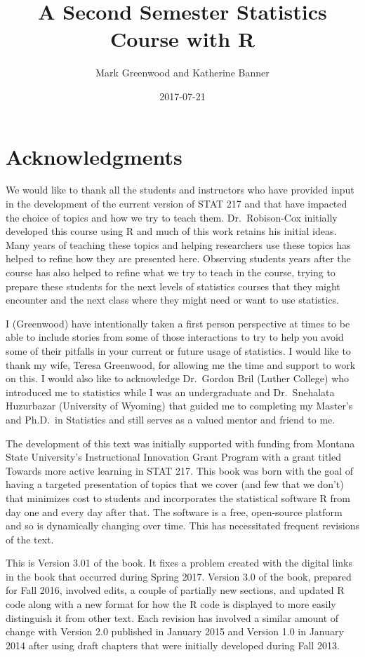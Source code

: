 \documentclass[]{book}
\title{A Second Semester Statistics Course with R}
\author{Mark Greenwood and Katherine Banner}
\date{2017-07-21}
\theoremstyle{definition}
\theoremstyle{definition}
\theoremstyle{remark}
\begin{document}
\maketitle

{
\setcounter{tocdepth}{1}
\tableofcontents
}
\chapter*{Acknowledgments}\label{acknowledgments}

We would like to thank all the students and instructors who have
provided input in the development of the current version of STAT 217 and
that have impacted the choice of topics and how we try to teach them.
Dr.~Robison-Cox initially developed this course using R and much of this
work retains his initial ideas. Many years of teaching these topics and
helping researchers use these topics has helped to refine how they are
presented here. Observing students years after the course has also
helped to refine what we try to teach in the course, trying to prepare
these students for the next levels of statistics courses that they might
encounter and the next class where they might need or want to use
statistics.

I (Greenwood) have intentionally taken a first person perspective at
times to be able to include stories from some of those interactions to
try to help you avoid some of their pitfalls in your current or future
usage of statistics. I would like to thank my wife, Teresa Greenwood,
for allowing me the time and support to work on this. I would also like
to acknowledge Dr.~Gordon Bril (Luther College) who introduced me to
statistics while I was an undergraduate and Dr.~Snehalata Huzurbazar
(University of Wyoming) that guided me to completing my Master's and
Ph.D.~in Statistics and still serves as a valued mentor and friend to
me.

The development of this text was initially supported with funding from
Montana State University's Instructional Innovation Grant Program with a
grant titled Towards more active learning in STAT 217. This book was
born with the goal of having a targeted presentation of topics that we
cover (and few that we don't) that minimizes cost to students and
incorporates the statistical software R from day one and every day after
that. The software is a free, open-source platform and so is dynamically
changing over time. This has necessitated frequent revisions of the
text.

This is Version 3.01 of the book. It fixes a problem created with the
digital links in the book that occurred during Spring 2017. Version 3.0
of the book, prepared for Fall 2016, involved edits, a couple of
partially new sections, and updated R code along with a new format for
how the R code is displayed to more easily distinguish it from other
text. Each revision has involved a similar amount of change with Version
2.0 published in January 2015 and Version 1.0 in January 2014 after
using draft chapters that were initially developed during Fall 2013.
\end{document}
